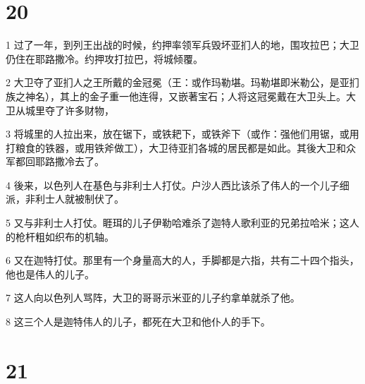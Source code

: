 \chapter{20}

\par 1 过了一年，到列王出战的时候，约押率领军兵毁坏亚扪人的地，围攻拉巴；大卫仍住在耶路撒冷。约押攻打拉巴，将城倾覆。
\par 2 大卫夺了亚扪人之王所戴的金冠冕（王：或作玛勒堪。玛勒堪即米勒公，是亚扪族之神名），其上的金子重一他连得，又嵌著宝石；人将这冠冕戴在大卫头上。大卫从城里夺了许多财物，
\par 3 将城里的人拉出来，放在锯下，或铁耙下，或铁斧下（或作：强他们用锯，或用打粮食的铁器，或用铁斧做工），大卫待亚扪各城的居民都是如此。其後大卫和众军都回耶路撒冷去了。
\par 4 後来，以色列人在基色与非利士人打仗。户沙人西比该杀了伟人的一个儿子细派，非利士人就被制伏了。
\par 5 又与非利士人打仗。睚珥的儿子伊勒哈难杀了迦特人歌利亚的兄弟拉哈米；这人的枪杆粗如织布的机轴。
\par 6 又在迦特打仗。那里有一个身量高大的人，手脚都是六指，共有二十四个指头，他也是伟人的儿子。
\par 7 这人向以色列人骂阵，大卫的哥哥示米亚的儿子约拿单就杀了他。
\par 8 这三个人是迦特伟人的儿子，都死在大卫和他仆人的手下。

\chapter{21}

